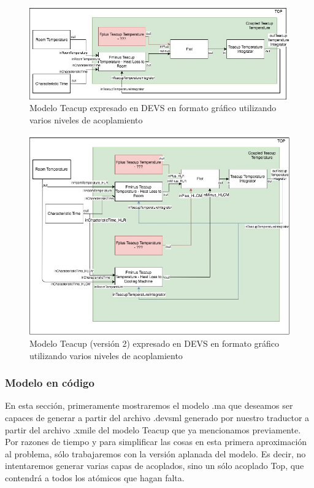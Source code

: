 \begin{figure}[!h]
\centering
\includegraphics[scale=0.35]{imagenes/Teacup_devs}
\caption{Modelo Teacup expresado en DEVS en formato gráfico utilizando varios niveles de acoplamiento}
\label{fig:Teacup_devs}
\end{figure}
\begin{figure}[!h]
\centering
\includegraphics[scale=0.35]{imagenes/Teacup_devs_2}
\caption{Modelo Teacup (versión 2) expresado en DEVS en formato gráfico utilizando varios niveles de acoplamiento}
\label{fig:Teacup_devs_2}
\end{figure}

\subsubsection{Modelo en código}
En esta sección, primeramente mostraremos el modelo .ma que deseamos ser capaces de generar a partir del archivo .devsml generado por nuestro traductor a partir del archivo .xmile del modelo Teacup que ya mencionamos previamente. Por razones de tiempo y para simplificar las cosas en esta primera aproximación al problema, sólo trabajaremos con la versión aplanada del modelo. Es decir, no intentaremos generar varias capas de acoplados, sino un sólo acoplado Top, que contendrá a todos los atómicos que hagan falta.

